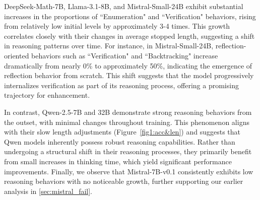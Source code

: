 \label{sec:deepseek-math_behabiur}
DeepSeek-Math-7B, Llama-3.1-8B, and Mistral-Small-24B exhibit substantial increases in the proportions of ``Enumeration" and ``Verification" behaviors, rising from relatively low initial levels by approximately 3-4 times. This growth correlates closely with their changes in average stopped length, suggesting a shift in reasoning patterns over time. For instance, in Mistral-Small-24B, reflection-oriented behaviors such as ``Verification" and ``Backtracking" increase dramatically from nearly 0\% to approximately 50\%, indicating the emergence of reflection behavior from scratch. This shift suggests that the model progressively internalizes verification as part of its reasoning process, offering a promising trajectory for enhancement.


\label{sec:qwen_behabiur}
In contrast, Qwen-2.5-7B and 32B demonstrate strong reasoning behaviors from the outset, with minimal changes throughout training. This phenomenon aligns with their slow length adjustments (Figure~\ref{fig1:acc&len}) and suggests that Qwen models inherently possess robust reasoning capabilities. Rather than undergoing a structural shift in their reasoning processes, they primarily benefit from small increases in thinking time, which yield significant performance improvements. Finally, we observe that Mistral-7B-v0.1 consistently exhibits low reasoning behaviors with no noticeable growth, further supporting our earlier analysis in \textsection\ref{sec:mistral_fail}.




